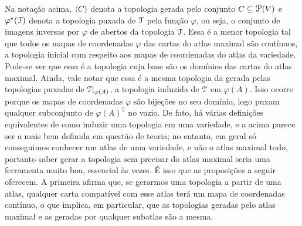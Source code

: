 Na notação acima, $\left\langle C \right\rangle$ denota a topologia gerada pelo conjunto $C \subseteq \p(V)$ e $\varphi^\star(\mathcal{T})$ denota a topologia puxada de $\mathcal{T}$ pela função $\varphi$, ou seja, o conjunto de imagens inversas por $\varphi$ de abertos da topologia $\mathcal{T}$. Essa é a menor topologia tal que todos os mapas de coordenadas $\varphi$ das cartas do atlas maximal são contínuos, a topologia inicial com respeito aos mapas de coordenadas do atlas da variedade. Pode-se ver que essa é a topologia cuja base são os domínios das cartas do atlas maximal. Ainda, vale notar que essa é a mesma topologia da gerada pelas topologias puxadas de $\mathcal{T}|_{\varphi(A)}$, a topologia induzida de $\mathcal{T}$ em $\varphi(A)$. Isso ocorre porque os mapas de coordenadas $\varphi$ são bijeções no seu domínio, logo puxam qualquer subconjunto de $\varphi(A)^\complement$ no vazio. De fato, há várias definições equivalentes de como induzir uma topologia em uma variedade, e a acima parece ser a mais bem definida em questão de teoria; no entanto, em geral só conseguimos conhecer um atlas de uma variedade, e não o atlas maximal todo, portanto saber gerar a topologia sem precisar do atlas maximal seria uma ferramenta muito boa, essencial às vezes. É isso que as proposições a seguir oferecem. A primeira afirma que, se gerarmos uma topologia a partir de uma atlas, qualquer carta compatível com esse atlas terá um mapa de coordenadas contínuo, o que implica, em particular, que as topologias geradas pelo atlas maximal e as geradas por qualquer subatlas são a mesma.

